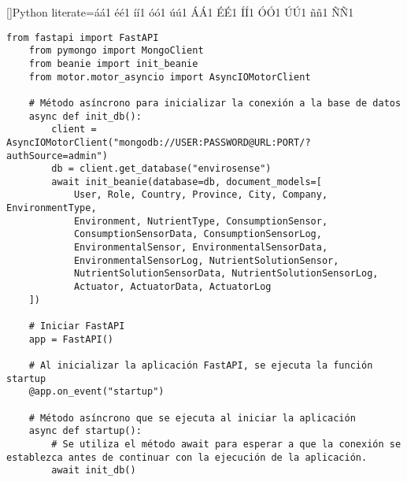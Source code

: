 []{Python}{
literate={á}{{\'a}}1 {é}{{\'e}}1 {í}{{\'i}}1 {ó}{{\'o}}1 {ú}{{\'u}}1
{Á}{{\'A}}1 {É}{{\'E}}1 {Í}{{\'I}}1 {Ó}{{\'O}}1 {Ú}{{\'U}}1
{ñ}{{\~n}}1 {Ñ}{{\~N}}1
}


\begin{lstlisting}[label=cod:bd_connection,caption=Cliente MQTT., language=PythonUTF8]
    from fastapi import FastAPI
    from pymongo import MongoClient
    from beanie import init_beanie
    from motor.motor_asyncio import AsyncIOMotorClient

    # Método asíncrono para inicializar la conexión a la base de datos
    async def init_db():
        client = AsyncIOMotorClient("mongodb://USER:PASSWORD@URL:PORT/?authSource=admin")
        db = client.get_database("envirosense")
        await init_beanie(database=db, document_models=[
            User, Role, Country, Province, City, Company, EnvironmentType, 
            Environment, NutrientType, ConsumptionSensor, 
            ConsumptionSensorData, ConsumptionSensorLog, 
            EnvironmentalSensor, EnvironmentalSensorData, 
            EnvironmentalSensorLog, NutrientSolutionSensor, 
            NutrientSolutionSensorData, NutrientSolutionSensorLog, 
            Actuator, ActuatorData, ActuatorLog
    ])

    # Iniciar FastAPI
    app = FastAPI()

    # Al inicializar la aplicación FastAPI, se ejecuta la función startup
    @app.on_event("startup")

    # Método asíncrono que se ejecuta al iniciar la aplicación
    async def startup():
        # Se utiliza el método await para esperar a que la conexión se establezca antes de continuar con la ejecución de la aplicación.
        await init_db()
\end{lstlisting}

